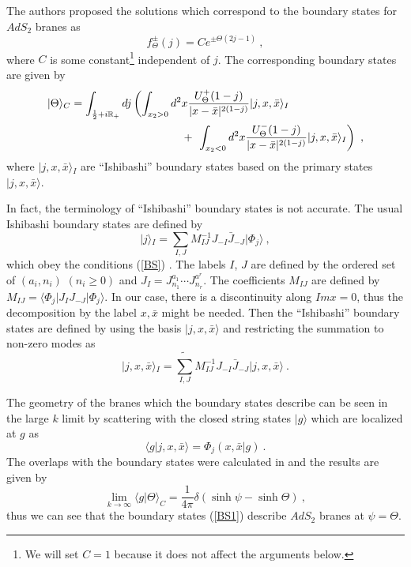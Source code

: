 \documentclass[a4paper,12pt]{article}
\newcommand{\br}{\mathbb R}
\newcommand{\ket}[1]{{|#1\rangle}{}}
\newcommand{\bra}[1]{{\langle#1|}}
\newcommand{\nn}{\nonumber\\}
\begin{document}
The authors \cite{LOP,PST} proposed the solutions which correspond to
the boundary states for $AdS_2$ branes as
\begin{equation}
 f^{\pm}_{\Theta} (j) = C e^{\pm \Theta (2j -1)} ~,
\label{BSS}
\end{equation}
where $C$ is some constant\footnote{
We will set $C=1$ because it does not affect the arguments below.
} independent of $j$.
The corresponding boundary states are given by
\begin{eqnarray}
 \lefteqn{\ket{\Theta}_C = 
  \int_{\frac{1}{2} + i \br_+} dj \left(
 \int _{x_2 > 0} d^2 x \frac{U^+_{\Theta} (1-j)}{|x - \bar{x}|^{2(1-j)}} 
  \ket{j,x,\bar{x}}_I \right.}\nn  && \hspace{4cm}+~\left.
  \int _{x_2 < 0} d^2 x \frac{U^-_{\Theta} (1-j)}{|x - \bar{x}|^{2(1-j)}} 
  \ket{j,x,\bar{x}}_I 
\right) ~,
\label{BS1}
\end{eqnarray}
where $\ket{j,x,\bar{x}}_I$ are ``Ishibashi'' boundary states based on the
primary states $\ket{j,x,\bar{x}}$. 

In fact, the terminology of ``Ishibashi'' boundary states is not accurate. 
The usual Ishibashi boundary states are defined by 
\begin{equation}
 \ket{j}_I = \sum_{I,J} M_{IJ}^{-1} J_{-I} \bar{J}_{-J} \ket{\Phi_j} ~,
\end{equation}
which obey the conditions (\ref{BS}) \cite{ishibashi,RR}. 
The labels $I$, $J$ are defined by the ordered 
set of $(a_i,n_i)$ $(n_i \geq 0)$ 
and $J_I = J^{a_1}_{n_1} \cdots J^{a^r}_{n_r}$. 
The coefficients $M_{IJ}$ are defined by 
$M_{IJ} = \bra{\Phi_j} J_I J_{-J} \ket{\Phi_j}$.
In our case, there is a discontinuity along $Im x = 0$, thus the
decomposition by the label $x, \bar{x}$ might be needed.
Then the  ``Ishibashi'' boundary states are defined by using the basis
$\ket{j,x,\bar{x}}$ and restricting the summation to non-zero modes as
\begin{equation}
 \ket{j,x,\bar{x}}_I = 
 \widetilde{\sum_{I,J}}  M_{IJ}^{-1} J_{-I} \bar{J}_{-J} \ket{j,x,\bar{x}}~.
\end{equation} 


The geometry of the branes which the boundary states describe 
can be seen in the large $k$ limit by scattering with the
closed string states $\ket{g}$ which are localized at $g$ \cite{MMS} as
\begin{equation}
 \bra{g} j,x, \bar{x} \rangle = \Phi_j (x,\bar{x} | g) ~.
\end{equation}
The overlaps with the boundary states were calculated in \cite{LOP,PST}
and the results are given by
\begin{equation}
 \lim_{k \to \infty} \bra{g}\Theta \rangle _C = 
 \frac{1}{4\pi} \delta (\sinh \psi - \sinh \Theta ) ~,
\end{equation}
thus we can see that the boundary states (\ref{BS1}) describe $AdS_2$
branes at $\psi = \Theta$.
\end{document}
